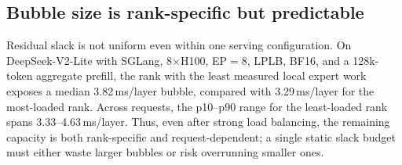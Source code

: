 




\subsection{Bubble size is rank-specific but predictable}
\label{sec:char-predict}

Residual slack is not uniform even within one serving configuration. On
DeepSeek-V2-Lite with SGLang, 8$\times$H100, \ac{EP}$=8$, LPLB,
BF16, and a 128k-token aggregate prefill, the rank with the least
measured local expert work exposes a median 3.82\,ms/layer bubble,
compared with 3.29\,ms/layer for the most-loaded rank. Across requests,
the p10--p90 range for the least-loaded rank spans
3.33--4.63\,ms/layer. Thus, even after strong load balancing, the
remaining capacity is both rank-specific and request-dependent; a single
static slack budget must either waste larger bubbles or risk overrunning
smaller ones.

